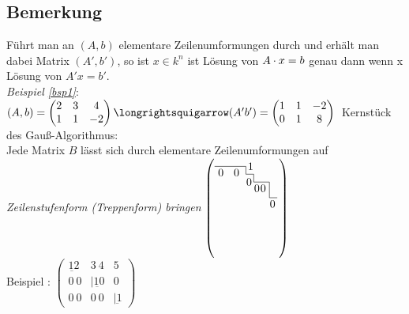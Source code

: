 \subsection{Bemerkung}\label{sec:9.9}
Führt man an $(A,b)$ elementare Zeilenumformungen durch und erhält man dabei Matrix $(A',b')$, so ist $x \in k^n$ ist Lösung von $A \cdot x = b$ genau dann wenn x Lösung von $A'x=b'$.\\
{\em Beispiel \ref{bsp1}}:\\
$(A,b) = \begin{pmatrix}
2& 3& 4\\
1& 1&-2
\end{pmatrix}\longrightsquigarrow (A'b') = \begin{pmatrix}
1& 1&-2\\
0& 1& 8
\end{pmatrix}\\$
Kernstück des Gau\ss-Algorithmus: \\
Jede Matrix $B$ lässt sich durch elementare Zeilenumformungen auf \emph{Zeilenstufenform (Treppenform) bringen} \qquad
$\left(\begin{tikzpicture}
\node () at (0.2,-0.2) {0};
\node () at (0.7,-0.2) {0};
\node () at (1.1,-0.5) {0};
\node () at (1.35,-0.7) {0};
\node () at (1.55,-0.7) {0};
\node () at (1.85,-1.2) {0};
\node () at (1.15,0) {1};
\draw (0,0)--(1,0)--(1,-0.25)--(1.25,-0.25)--(1.25,-0.5)--(1.5,-0.5)--(1.75,-0.5)--(1.75,-1)--(2,-1);
\end{tikzpicture}\right)$\\
Beispiel : $\begin{pmatrix}
\underbar{1 2}& 3\  4 & 5\\
0\ 0 &\vert\underbar{1 0}& 0\\
0\ 0 & 0\ 0 &\vert\underbar{1}
\end{pmatrix}$
